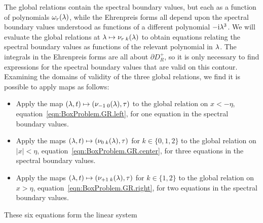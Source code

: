\documentclass[11pt,reqno,oneside,a4paper]{article}
\begin{document}
The global relations contain the spectral boundary values, but each as a function of polynomials $\omega_r(\lambda)$, while the Ehrenpreis forms all depend upon the spectral boundary values understood as functions of a different polynomial $-\mathrm{i}\lambda^3$.
We will evaluate the global relations at $\lambda\mapsto\nu_{r\; k}(\lambda)$ to obtain equations relating the spectral boundary values as functions of the relevant polynomial in $\lambda$.
The integrals in the Ehrenpreis forms are all about $\partial D_R^+$, so it is only necessary to find expressions for the spectral boundary values that are valid on this contour.
Examining the domains of validity of the three global relations, we find it is possible to apply maps as follows:
\begin{itemize}
    \item{
        Apply the map $(\lambda,t)\mapsto(\nu_{-1\;0}(\lambda),\tau)$ to the global relation on $x<-\eta$, equation~\eqref{eqn:BoxProblem.GR.left}, for one equation in the spectral boundary values.
    }
    \item{
        Apply the maps $(\lambda,t)\mapsto(\nu_{0\; k}(\lambda),\tau)$ for $k\in\{0,1,2\}$ to the global relation on $\lvert x \rvert < \eta$, equation~\eqref{eqn:BoxProblem.GR.center}, for three equations in the spectral boundary values.
    }
    \item{
        Apply the maps $(\lambda,t)\mapsto(\nu_{+1\; k}(\lambda),\tau)$ for $k\in\{1,2\}$ to the global relation on $x>\eta$, equation~\eqref{eqn:BoxProblem.GR.right}, for two equations in the spectral boundary values.
    }
\end{itemize}
These six equations form the linear system
\end{document}
